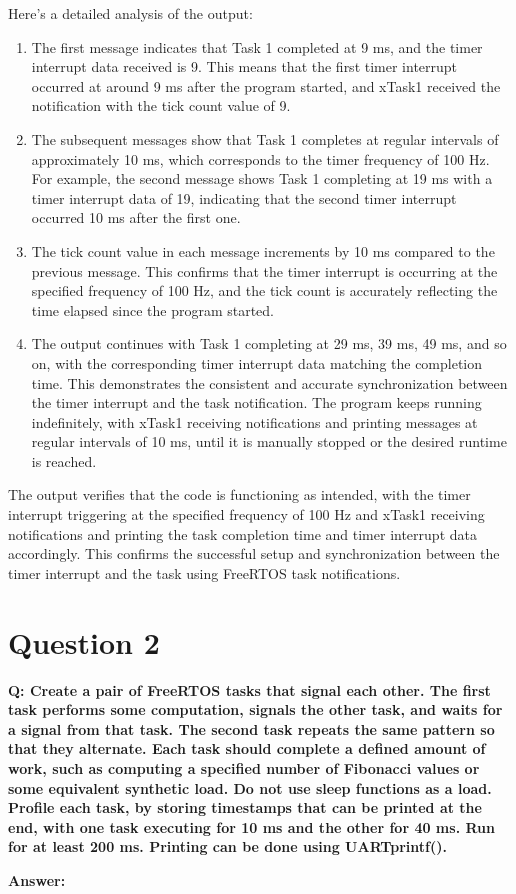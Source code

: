 \documentclass[a4paper,11pt]{article}%
\newenvironment{qanda}{\setlength{\parindent}{0pt}}{\bigskip}
\newcommand{\Q}{\bigskip\bfseries Q: }
\newcommand{\A}{\par\textbf{Answer: } \normalfont}
\begin{document}
\begin{qanda}
	
	Here's a detailed analysis of the output:
	\begin{enumerate}
		\item The first message indicates that Task 1 completed at 9 ms, and the timer interrupt data received is 9. This means that the first timer interrupt occurred at around 9 ms after the program started, and xTask1 received the notification with the tick count value of 9.
		\item The subsequent messages show that Task 1 completes at regular intervals of approximately 10 ms, which corresponds to the timer frequency of 100 Hz. For example, the second message shows Task 1 completing at 19 ms with a timer interrupt data of 19, indicating that the second timer interrupt occurred 10 ms after the first one.
		\item The tick count value in each message increments by 10 ms compared to the previous message. This confirms that the timer interrupt is occurring at the specified frequency of 100 Hz, and the tick count is accurately reflecting the time elapsed since the program started.
		\item The output continues with Task 1 completing at 29 ms, 39 ms, 49 ms, and so on, with the corresponding timer interrupt data matching the completion time. This demonstrates the consistent and accurate synchronization between the timer interrupt and the task notification.
		The program keeps running indefinitely, with xTask1 receiving notifications and printing messages at regular intervals of 10 ms, until it is manually stopped or the desired runtime is reached.
	\end{enumerate}
	
	
	
	
	
	The output verifies that the code is functioning as intended, with the timer interrupt triggering at the specified frequency of 100 Hz and xTask1 receiving notifications and printing the task completion time and timer interrupt data accordingly. This confirms the successful setup and synchronization between the timer interrupt and the task using FreeRTOS task notifications.
	
	
	
	\pagebreak
	\section{Question 2}
	\Q   Create a pair of FreeRTOS tasks that signal each other. The first task performs some computation,
	signals the other task, and waits for a signal from that task. The second task repeats the same pattern
	so that they alternate. Each task should complete a defined amount of work, such as computing a
	specified number of Fibonacci values or some equivalent synthetic load. Do not use sleep functions as a
	load. Profile each task, by storing timestamps that can be printed at the end, with one task executing
	for 10 ms and the other for 40 ms. Run for at least 200 ms. Printing can be done using UARTprintf().
	\A


\end{qanda}
\end{document}
